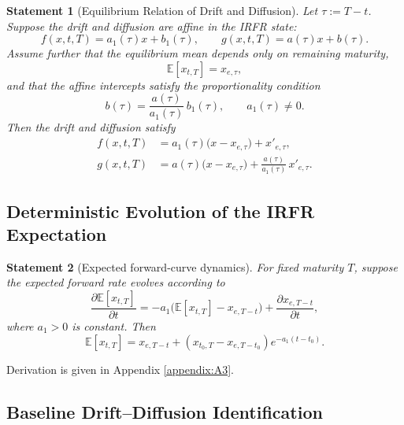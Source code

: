 \documentclass[12pt]{article}
\theoremstyle{statementstyle}
\newtheorem{statement}{Statement}[section]
\begin{document}
\begin{statement}[Equilibrium Relation of Drift and Diffusion]
\label{stmt:eqrelation}
\emph{
Let \(\tau:=T-t\). Suppose the drift and diffusion are affine in the IRFR state:
}
\[
f(x,t,T)=a_1(\tau)x+b_1(\tau),\qquad
g(x,t,T)=a(\tau)x+b(\tau).
\]
\emph{
Assume further that the equilibrium mean depends only on remaining maturity,
}
\[
\mathbb{E}[x_{t,T}]=x_{e,\tau},
\]
\emph{
and that the affine intercepts satisfy the proportionality condition
}
\[
b(\tau)=\frac{a(\tau)}{a_1(\tau)}\,b_1(\tau),
\qquad a_1(\tau)\neq 0.
\]
\emph{
Then the drift and diffusion satisfy
}
\begin{align}
f(x,t,T)
&=
a_1(\tau)\bigl(x-x_{e,\tau}\bigr)+x'_{e,\tau},
\tag{3.2.1a}\label{eq:eqdrift}\\[0.3em]
g(x,t,T)
&=
a(\tau)\bigl(x-x_{e,\tau}\bigr)
+
\frac{a(\tau)}{a_1(\tau)}\,x'_{e,\tau}.
\tag{3.2.1b}\label{eq:eqdiffusion}
\end{align}
\end{statement}
\subsection{Deterministic Evolution of the IRFR Expectation}

\begin{statement}[Expected forward-curve dynamics]\label{stmt:expectation}
\normalfont
For fixed maturity \(T\), suppose the expected forward rate evolves according to
\[
\frac{\partial \mathbb{E}[x_{t,T}]}{\partial t}
=
-a_1\bigl(\mathbb{E}[x_{t,T}] - x_{e,T-t}\bigr)
+
\frac{\partial x_{e,T-t}}{\partial t},
\]
where \(a_1>0\) is constant. Then
\begin{equation}
\mathbb{E}[x_{t,T}]
=
x_{e,T-t}
+
\left(x_{t_0,T}-x_{e,T-t_0}\right)e^{-a_1(t-t_0)}.
\tag{3.3.1}\label{eq:expectation-general}
\end{equation}
\end{statement}

Derivation is given in Appendix \ref{appendix:A3}.

\subsection{Baseline Drift--Diffusion Identification}
\end{document}
